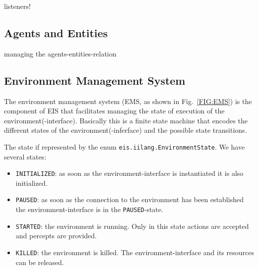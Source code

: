 \documentclass[a4]{article}
\newcommand{\EIS}{\textsf{EIS}\xspace}
\begin{document}
listeners!

\subsection{Agents and Entities}

managing the agents-entities-relation

\subsection{Environment Management System}

The environment management system (EMS, as shown in Fig.~\ref{FIG:EMS}) is the component of \EIS that facilitates managing the
state of execution of the environment(-interface). Basically this is a finite state machine that encodes the different
states of the environment(-inferface) and the possible state transitions.

The state if represented by the enum \texttt{eis.iilang.EnvironmentState}.
We have several states:
\begin{itemize}
\item\texttt{INITIALIZED}:
as soon as the environment-interface is instantiated it is also initialized. 
\item\texttt{PAUSED}: as soon as the connection to the environment has been
established the environment-interface is in the \texttt{PAUSED}-state.
\item\texttt{STARTED}: the environment is running. Only in this state actions are accepted and 
percepts are provided. 
\item\texttt{KILLED}: the environment is killed. The environment-interface  and its resources can be released.
\end{itemize}
\end{document}
